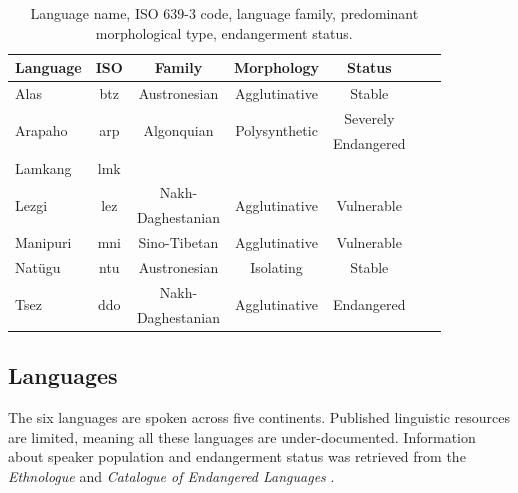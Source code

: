 \bgroup
\def\arraystretch{1.25}
\begin{table}[h!]
    \begin{center}
    \begin{tabular}{lcccccc} 
    \textbf{Language} & \textbf{ISO} & \textbf{Family} & \textbf{Morphology} & \textbf{Status} \\
    \hline
    Alas & btz & Austronesian & Agglutinative & Stable \\
    \hline
    \multirow{2}{*}{Arapaho} & \multirow{2}{*}{arp} & \multirow{2}{*}{Algonquian} & \multirow{2}{*}{Polysynthetic} & Severely   \\ 
     & & & & Endangered  \\
    \hline
    \multirow{2}{*}{Lamkang} & \multirow{2}{*}{lmk} &  & \multirow{2}{*}{} & \multirow{2}{*}{}   \\
     & &   & &   \\
    \hline
    \multirow{2}{*}{Lezgi} & \multirow{2}{*}{lez} & Nakh- & \multirow{2}{*}{Agglutinative} & \multirow{2}{*}{Vulnerable} \\
     & & Daghestanian  & &  \\
    \hline
    Manipuri & mni & Sino-Tibetan & Agglutinative & Vulnerable  \\
    \hline
    Natügu & ntu & Austronesian & Isolating & Stable \\
    \hline
    \multirow{2}{*}{Tsez} & \multirow{2}{*}{ddo} & Nakh- & \multirow{2}{*}{Agglutinative} & \multirow{2}{*}{Endangered}   \\
     & & Daghestanian  &  &  \\

	\end{tabular}
	\caption[Data]{Language name, ISO 639-3 code, language family, predominant morphological type, endangerment status.}
	\label{tab:langs}
\end{center}
\end{table}


\subsection{Languages} 

The six languages are spoken across five continents.
Published linguistic resources are limited, meaning all these languages are under-documented. Information about speaker population and endangerment status was retrieved from the \emph{Ethnologue} \citep{eberhard_ethnologue:2020} and \emph{Catalogue of Endangered Languages} \citep{elcat_2020}.


